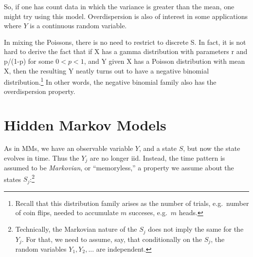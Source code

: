 \documentclass[11pt]{article}
\begin{document}
% 
% 
% 
% 
% 
% 
% 
% 
% 

So, if one has count data in which the variance is greater than the
mean, one might try using this model.  Overdispersion is also of
interest in some applications where $Y$ is a continuous random variable.

In mixing the Poissons, there is no need to restrict to discrete S.  In
fact, it is not hard to derive the fact that if X has a gamma
distribution with parameters r and p/(1-p) for some $0 < p < 1$, and Y
given X has a Poisson distribution with mean X, then the resulting Y
neatly turns out to have a negative binomial
distribution.\footnote{Recall that this distribution family arises as
the number of trials, e.g.\ number of coin flips, needed to accumulate
$m$ succeses, e.g.\ $m$ heads.}  In other words, the negative binomial
family also has the overdispersion property.

\section{Hidden Markov Models}

As in MMs, we have an observable variable $Y$, and a state $S$, but now
the state evolves in time.  Thus the $Y_j$ are no longer iid.  Instead,
the time pattern is assumed to be \textit{Markovian}, or ``memoryless,''
a property we assume about the states $S_j$:\footnote{Technically, the
Markovian nature of the $S_j$ does not imply the same for the $Y_j$.
For that, we need to assume, say, that conditionally on the $S_j$, the
random variables $Y_1, Y_2,...$ are independent.}
\end{document}
